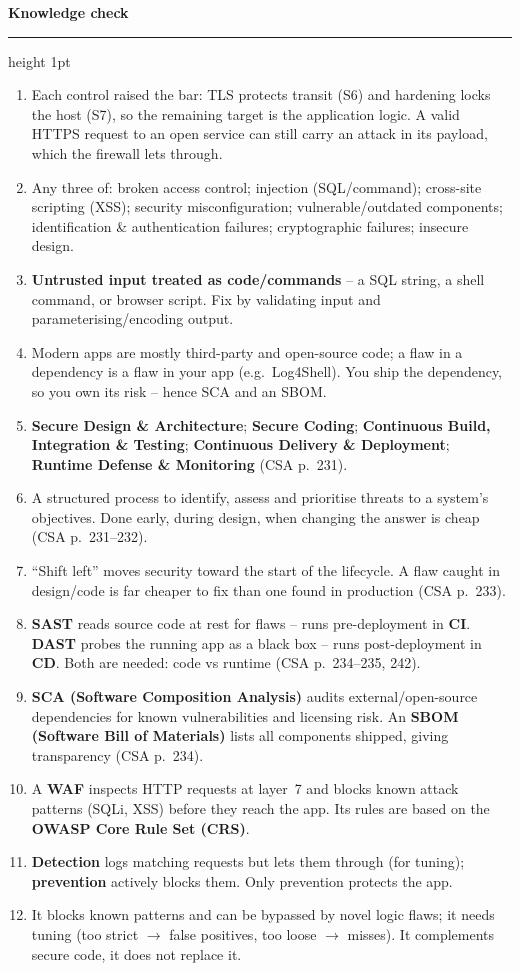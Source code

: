 \documentclass[11pt]{article}
\newcommand{\wbsection}[1]{\par\vspace{11pt}\noindent
  {\large\bfseries\color{kred}#1}\par\vspace{2pt}
  {\color{kred!35}\hrule height 1pt}\par\vspace{6pt}}
\renewcommand{\emph}[1]{\textup{#1}}
\begin{document}
\wbsection{Knowledge check}
\begin{enumerate}
\item Each control raised the bar: TLS protects transit (S6) and hardening locks the host (S7), so the
      remaining target is the \emph{application logic}. A valid HTTPS request to an open service can
      still carry an attack in its payload, which the firewall lets through.
\item Any three of: broken access control; injection (SQL/command); cross-site scripting (XSS); security
      misconfiguration; vulnerable/outdated components; identification \& authentication failures;
      cryptographic failures; insecure design.
\item \textbf{Untrusted input treated as code/commands} -- a SQL string, a shell command, or browser
      script. Fix by validating input and parameterising/encoding output.
\item Modern apps are mostly third-party and open-source code; a flaw in a dependency is a flaw in your
      app (e.g.\ Log4Shell). You ship the dependency, so you own its risk -- hence SCA and an SBOM.
\item \textbf{Secure Design \& Architecture}; \textbf{Secure Coding}; \textbf{Continuous Build,
      Integration \& Testing}; \textbf{Continuous Delivery \& Deployment}; \textbf{Runtime Defense \&
      Monitoring} (CSA p.~231).
\item A structured process to identify, assess and prioritise threats to a system's objectives. Done
      \emph{early}, during design, when changing the answer is cheap (CSA p.~231--232).
\item ``Shift left'' moves security toward the start of the lifecycle. A flaw caught in design/code is
      far cheaper to fix than one found in production (CSA p.~233).
\item \textbf{SAST} reads source code at rest for flaws -- runs pre-deployment in \textbf{CI}.
      \textbf{DAST} probes the running app as a black box -- runs post-deployment in \textbf{CD}. Both
      are needed: code vs runtime (CSA p.~234--235, 242).
\item \textbf{SCA (Software Composition Analysis)} audits external/open-source dependencies for known
      vulnerabilities and licensing risk. An \textbf{SBOM (Software Bill of Materials)} lists all
      components shipped, giving transparency (CSA p.~234).
\item A \textbf{WAF} inspects HTTP requests at layer~7 and blocks known attack patterns (SQLi, XSS)
      before they reach the app. Its rules are based on the \textbf{OWASP Core Rule Set (CRS)}.
\item \textbf{Detection} logs matching requests but lets them through (for tuning); \textbf{prevention}
      actively blocks them. Only prevention protects the app.
\item It blocks \emph{known} patterns and can be bypassed by novel logic flaws; it needs tuning (too
      strict $\rightarrow$ false positives, too loose $\rightarrow$ misses). It complements secure code,
      it does not replace it.
\end{enumerate}
\end{document}
